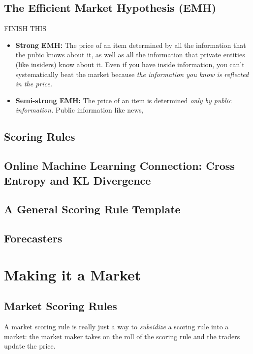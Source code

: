 \documentclass[11pt, a4paper]{article}
\theoremstyle{definition}
\begin{document}
\subsection{The Efficient Market Hypothesis (EMH)}
FINISH THIS

\begin{itemize}
    \item \textbf{Strong EMH:} The price of an item determined by all the information that the pubic knows about it, as well as all the information that private entities (like insiders) know about it. Even if you have inside information, you can't systematically beat the market because \textit{the information you know is reflected in the price.}
    \item \textbf{Semi-strong EMH:} The price of an item is determined \textit{only by public information.} Public information like news, 
\end{itemize}


\subsection{Scoring Rules}


\subsection{Online Machine Learning Connection: Cross Entropy and KL Divergence}

\subsection{A General Scoring Rule Template}


\subsection{Forecasters}

\section{Making it a Market}
\subsection{Market Scoring Rules} 
A market scoring rule is really just a way to \textit{subsidize} a scoring 
rule into a market: the market maker takes on the roll of the scoring rule 
and the traders update the price. 
\end{document}
